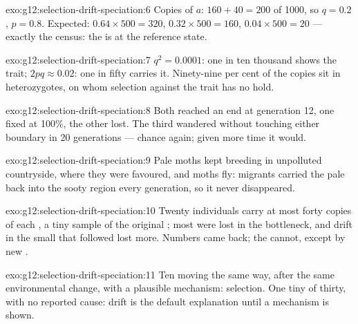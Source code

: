 \begin{solution}{exo:g12:selection-drift-speciation:6}
Copies of $a$: $160 + 40 = 200$ of 1000, so $q = 0.2$, $p = 0.8$.
Expected: $0.64 \times 500 = 320$, $0.32 \times 500 = 160$, $0.04
\times 500 = 20$ --- exactly the census: the  is at the
reference state.
\end{solution}

\begin{solution}{exo:g12:selection-drift-speciation:7}
$q^2 = 0.0001$: one in ten thousand shows the trait; $2pq \approx
0.02$: one in fifty carries it. Ninety-nine per cent of the copies sit
in heterozygotes, on whom selection against the trait has no hold.
\end{solution}

\begin{solution}{exo:g12:selection-drift-speciation:8}
Both reached an end at generation 12, one fixed at 100\%, the other
lost. The third wandered without touching either boundary in 20
generations --- chance again; given more time it would.
\end{solution}

\begin{solution}{exo:g12:selection-drift-speciation:9}
Pale moths kept breeding in unpolluted countryside, where they were
favoured, and moths fly: migrants carried the pale  back into
the sooty region every generation, so it never disappeared.
\end{solution}

\begin{solution}{exo:g12:selection-drift-speciation:10}
Twenty individuals carry at most forty copies of each , a tiny
sample of the original ; most were lost in the bottleneck, and
drift in the small  that followed lost more. Numbers came
back; the  cannot, except by new .
\end{solution}

\begin{solution}{exo:g12:selection-drift-speciation:11}
Ten  moving the same way, after the same environmental
change, with a plausible mechanism: selection. One tiny  of
thirty, with no reported cause: drift is the default explanation until
a mechanism is shown.
\end{solution}

